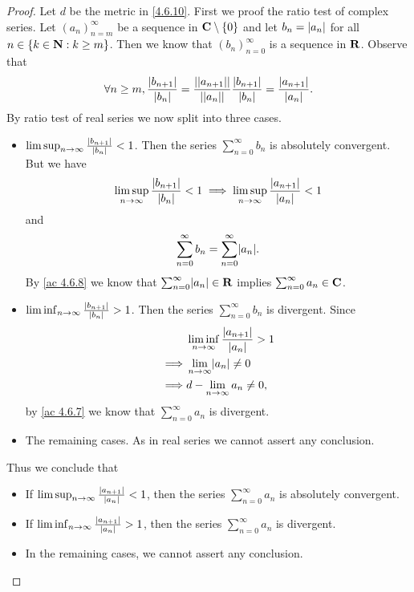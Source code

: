 \begin{proof}
  Let \(d\) be the metric in \cref{4.6.10}.
  First we proof the ratio test of complex series.
  Let \((a_n)_{n = m}^\infty\) be a sequence in \(\mathbf{C} \setminus \{0\}\) and let \(b_n = \left\lvert a_n\right\rvert\) for all \(n \in \{k \in \mathbf{N} : k \geq m\}\).
  Then we know that \((b_n)_{n = 0}^\infty\) is a sequence in \(\mathbf{R}\).
  Observe that
  \[
    \forall n \geq m, \frac{\left\lvert b_{n + 1}\right\rvert}{\left\lvert b_n\right\rvert} = \frac{\left\lvert\left\lvert a_{n + 1}\right\rvert\right\rvert}{\left\lvert\left\lvert a_n\right\rvert\right\rvert} \frac{\left\lvert b_{n + 1}\right\rvert}{\left\lvert b_n\right\rvert} = \frac{\left\lvert a_{n + 1}\right\rvert}{\left\lvert a_n\right\rvert}.
  \]
  By ratio test of real series we now split into three cases.
  \begin{itemize}
    \item \(\limsup_{n \to \infty} \frac{\left\lvert b_{n + 1}\right\rvert}{\left\lvert b_n\right\rvert} < 1\).
          Then the series \(\sum_{n = 0}^\infty b_n\) is absolutely convergent.
          But we have
          \[
            \limsup_{n \to \infty} \frac{\left\lvert b_{n + 1}\right\rvert}{\left\lvert b_n\right\rvert} < 1 \implies \limsup_{n \to \infty} \frac{\left\lvert a_{n + 1}\right\rvert}{\left\lvert a_n\right\rvert} < 1
          \]
          and
          \[
            \sum_{n = 0}^\infty b_n = \sum_{n = 0}^\infty \abs{a_n}.
          \]
          By \cref{ac 4.6.8} we know that \(\sum_{n = 0}^\infty \abs{a_n} \in \R\) implies \(\sum_{n = 0}^\infty a_n \in \mathbf{C}\).
    \item \(\liminf_{n \to \infty} \frac{\left\lvert b_{n + 1}\right\rvert}{\left\lvert b_n\right\rvert} > 1\).
          Then the series \(\sum_{n = 0}^\infty b_n\) is divergent.
          Since
          \begin{align*}
                     & \liminf_{n \to \infty} \frac{\abs{a_{n + 1}}}{\abs{a_n}} > 1 \\
            \implies & \lim_{n \to \infty} \abs{a_n} \neq 0                         \\
            \implies & d - \lim_{n \to \infty} a_n \neq 0,
          \end{align*}
          by \cref{ac 4.6.7} we know that \(\sum_{n = 0}^\infty a_n\) is divergent.
    \item The remaining cases.
          As in real series we cannot assert any conclusion.
  \end{itemize}
  Thus we conclude that
  \begin{itemize}
    \item If \(\limsup_{n \to \infty} \frac{\left\lvert a_{n + 1}\right\rvert}{\left\lvert a_n\right\rvert} < 1\), then the series \(\sum_{n = 0}^\infty a_n\) is absolutely convergent.
    \item If \(\liminf_{n \to \infty} \frac{\left\lvert a_{n + 1}\right\rvert}{\left\lvert a_n\right\rvert} > 1\), then the series \(\sum_{n = 0}^\infty a_n\) is divergent.
    \item In the remaining cases, we cannot assert any conclusion.
  \end{itemize}


\end{proof}
